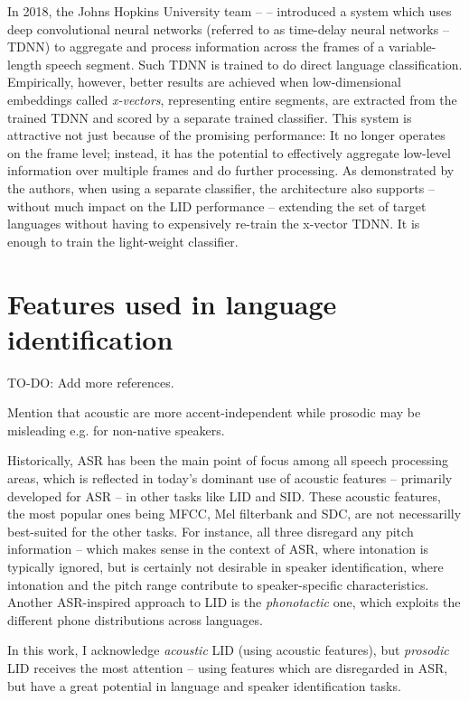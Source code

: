 \documentclass[bsc,frontabs,twoside,singlespacing,parskip,deptreport]{infthesis}
\begin{document}
{{    In 2018, the Johns Hopkins University team -- \cite{Snyder_et_al_2018} -- introduced a system which uses deep convolutional neural networks (referred to as time-delay neural networks -- TDNN) to aggregate and process information across the frames of a variable-length speech segment. Such TDNN is trained to do direct language classification. Empirically, however, better results are achieved when low-dimensional embeddings called \textit{x-vectors}, representing entire segments, are extracted from the trained TDNN and scored by a separate trained classifier. This system is attractive not just because of the promising performance: It no longer operates on the frame level; instead, it has the potential to effectively aggregate low-level information over multiple frames and do further processing. As demonstrated by the authors, when using a separate classifier, the architecture also supports -- without much impact on the LID performance -- extending the set of target languages without having to expensively re-train the x-vector TDNN. It is enough to train the light-weight classifier.
  }
  \section{Features used in language identification}{
    TO-DO: Add more references.

    Mention that acoustic are more accent-independent while prosodic may be misleading e.g. for non-native speakers.

    Historically, ASR has been the main point of focus among all speech processing areas, which is reflected in today's dominant use of acoustic features -- primarily developed for ASR -- in other tasks like LID and SID. These acoustic features, the most popular ones being MFCC, Mel filterbank and SDC, are not necessarilly best-suited for the other tasks. For instance, all three disregard any pitch information -- which makes sense in the context of ASR, where intonation is typically ignored, but is certainly not desirable in speaker identification, where intonation and the pitch range contribute to speaker-specific characteristics. Another ASR-inspired approach to LID is the \textit{phonotactic} one, which exploits the different phone distributions across languages.

    In this work, I acknowledge \textit{acoustic} LID (using acoustic features), but \textit{prosodic} LID receives the most attention -- using features which are disregarded in ASR, but have a great potential in language and speaker identification tasks.

}}
\end{document}
